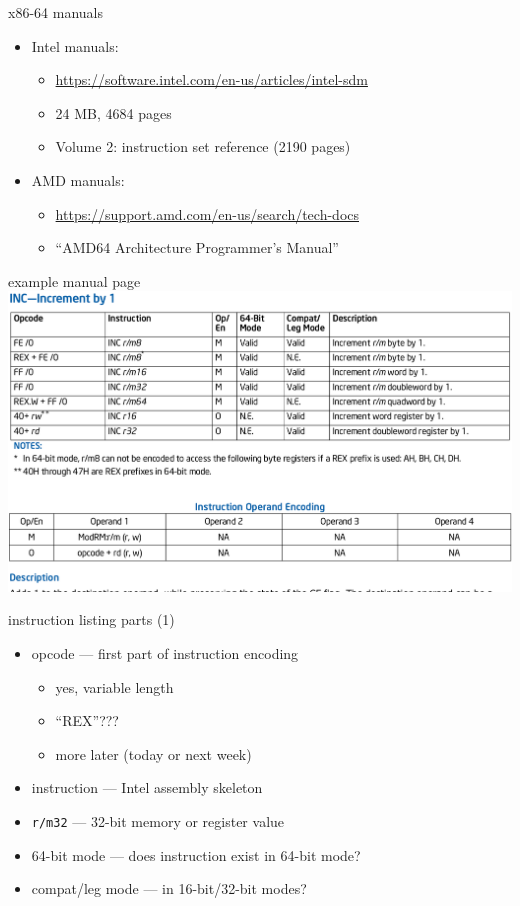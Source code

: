 \begin{frame}{x86-64 manuals}
\begin{itemize}
\item Intel manuals:
    \begin{itemize}
    \item \small \url{https://software.intel.com/en-us/articles/intel-sdm}
    \item 24 MB, 4684 pages
    \item Volume 2: instruction set reference (2190 pages)
    \end{itemize}
\item AMD manuals:
    \begin{itemize}
    \item \small \url{https://support.amd.com/en-us/search/tech-docs}
    \item ``AMD64 Architecture Programmer's Manual''
    \end{itemize}
\end{itemize}
\end{frame}

\begin{frame}{example manual page}
\includegraphics[width=\textwidth]{../asm/example-manual}
\end{frame}

\begin{frame}{instruction listing parts (1)}
    \begin{itemize}
    \item opcode --- first part of instruction encoding
        \begin{itemize}
        \item yes, variable length
        \item ``REX''???
        \item more later (today or next week)
        \end{itemize}
    \item instruction --- Intel assembly skeleton
    \item {\tt r/m32} --- 32-bit memory or register value
    \item 64-bit mode --- does instruction exist in 64-bit mode?
    \item compat/leg mode --- in 16-bit/32-bit modes?
    \end{itemize}
\end{frame}


